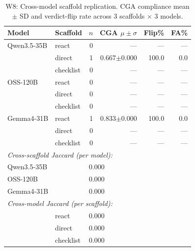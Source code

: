 \begin{table}[t]
\centering
\caption{W8: Cross-model scaffold replication. CGA compliance mean $\pm$ SD and verdict-flip rate across 3 scaffolds $\times$ 3 models.}
\label{tab:w8_crossmodel}
\begin{tabular}{ll rrr r}
\toprule
Model & Scaffold & $n$ & CGA $\mu\pm\sigma$ & Flip\% & FA\% \\
\midrule
  Qwen3.5-35B & react & 0 & --- & --- & --- \\
   & direct & 1 & 0.667$\pm$0.000 & 100.0 & 0.0 \\
   & checklist & 0 & --- & --- & --- \\
\midrule
  OSS-120B & react & 0 & --- & --- & --- \\
   & direct & 0 & --- & --- & --- \\
   & checklist & 0 & --- & --- & --- \\
\midrule
  Gemma4-31B & react & 1 & 0.833$\pm$0.000 & 100.0 & 0.0 \\
   & direct & 0 & --- & --- & --- \\
   & checklist & 0 & --- & --- & --- \\
\midrule
\multicolumn{6}{l}{\textit{Cross-scaffold Jaccard (per model):}} \\
  Qwen3.5-35B & & \multicolumn{4}{l}{0.000} \\
  OSS-120B & & \multicolumn{4}{l}{0.000} \\
  Gemma4-31B & & \multicolumn{4}{l}{0.000} \\
\multicolumn{6}{l}{\textit{Cross-model Jaccard (per scaffold):}} \\
  & react & \multicolumn{4}{l}{0.000} \\
  & direct & \multicolumn{4}{l}{0.000} \\
  & checklist & \multicolumn{4}{l}{0.000} \\
\bottomrule
\end{tabular}
\end{table}